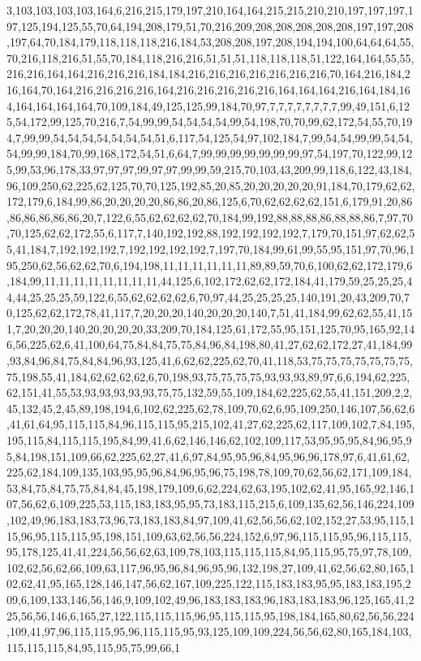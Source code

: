 3,103,103,103,103,164,6,216,215,179,197,210,164,164,215,215,210,210,197,197,197,197,125,194,125,55,70,64,194,208,179,51,70,216,209,208,208,208,208,208,197,197,208,197,64,70,184,179,118,118,118,216,184,53,208,208,197,208,194,194,100,64,64,64,55,70,216,118,216,51,55,70,184,118,216,216,51,51,51,118,118,118,51,122,164,164,55,55,216,216,164,164,216,216,216,184,184,216,216,216,216,216,216,216,70,164,216,184,216,164,70,164,216,216,216,216,164,216,216,216,216,216,164,164,164,216,164,184,164,164,164,164,164,70,109,184,49,125,125,99,184,70,97,7,7,7,7,7,7,7,7,99,49,151,6,125,54,172,99,125,70,216,7,54,99,99,54,54,54,54,99,54,198,70,70,99,62,172,54,55,70,194,7,99,99,54,54,54,54,54,54,54,51,6,117,54,125,54,97,102,184,7,99,54,54,99,99,54,54,54,99,99,184,70,99,168,172,54,51,6,64,7,99,99,99,99,99,99,99,97,54,197,70,122,99,125,99,53,96,178,33,97,97,97,99,97,97,99,99,59,215,70,103,43,209,99,118,6,122,43,184,96,109,250,62,225,62,125,70,70,125,192,85,20,85,20,20,20,20,20,91,184,70,179,62,62,172,179,6,184,99,86,20,20,20,20,86,86,20,86,125,6,70,62,62,62,62,151,6,179,91,20,86,86,86,86,86,86,20,7,122,6,55,62,62,62,62,70,184,99,192,88,88,88,86,88,88,86,7,97,70,70,125,62,62,172,55,6,117,7,140,192,192,88,192,192,192,192,7,179,70,151,97,62,62,55,41,184,7,192,192,192,7,192,192,192,192,7,197,70,184,99,61,99,55,95,151,97,70,96,195,250,62,56,62,62,70,6,194,198,11,11,11,11,11,11,89,89,59,70,6,100,62,62,172,179,6,184,99,11,11,11,11,11,11,11,11,44,125,6,102,172,62,62,172,184,41,179,59,25,25,25,44,44,25,25,25,59,122,6,55,62,62,62,62,6,70,97,44,25,25,25,25,140,191,20,43,209,70,70,125,62,62,172,78,41,117,7,20,20,20,140,20,20,20,140,7,51,41,184,99,62,62,55,41,151,7,20,20,20,140,20,20,20,20,33,209,70,184,125,61,172,55,95,151,125,70,95,165,92,146,56,225,62,6,41,100,64,75,84,84,75,75,84,96,84,198,80,41,27,62,62,172,27,41,184,99,93,84,96,84,75,84,84,96,93,125,41,6,62,62,225,62,70,41,118,53,75,75,75,75,75,75,75,75,198,55,41,184,62,62,62,62,6,70,198,93,75,75,75,75,93,93,93,89,97,6,6,194,62,225,62,151,41,55,53,93,93,93,93,93,75,75,132,59,55,109,184,62,225,62,55,41,151,209,2,2,45,132,45,2,45,89,198,194,6,102,62,225,62,78,109,70,62,6,95,109,250,146,107,56,62,6,41,61,64,95,115,115,84,96,115,115,95,215,102,41,27,62,225,62,117,109,102,7,84,195,195,115,84,115,115,195,84,99,41,6,62,146,146,62,102,109,117,53,95,95,95,84,96,95,95,84,198,151,109,66,62,225,62,27,41,6,97,84,95,95,96,84,95,96,96,178,97,6,41,61,62,225,62,184,109,135,103,95,95,96,84,96,95,96,75,198,78,109,70,62,56,62,171,109,184,53,84,75,84,75,75,84,84,45,198,179,109,6,62,224,62,63,195,102,62,41,95,165,92,146,107,56,62,6,109,225,53,115,183,183,95,95,73,183,115,215,6,109,135,62,56,146,224,109,102,49,96,183,183,73,96,73,183,183,84,97,109,41,62,56,56,62,102,152,27,53,95,115,115,96,95,115,115,95,198,151,109,63,62,56,56,224,152,6,97,96,115,115,95,96,115,115,95,178,125,41,41,224,56,56,62,63,109,78,103,115,115,115,84,95,115,95,75,97,78,109,102,62,56,62,66,109,63,117,96,95,96,84,96,95,96,132,198,27,109,41,62,56,62,80,165,102,62,41,95,165,128,146,147,56,62,167,109,225,122,115,183,183,95,95,183,183,195,209,6,109,133,146,56,146,9,109,102,49,96,183,183,183,96,183,183,183,96,125,165,41,225,56,56,146,6,165,27,122,115,115,115,96,95,115,115,95,198,184,165,80,62,56,56,224,109,41,97,96,115,115,95,96,115,115,95,93,125,109,109,224,56,56,62,80,165,184,103,115,115,115,84,95,115,95,75,99,66,1